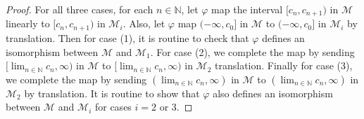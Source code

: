 \documentclass{article}
\begin{document}
\begin{enumerate}[label={\bf Q\arabic*:}]
\begin{enumerate}
\begin{proof}
          For all three cases, for each $n\in\mathbb{N}$, let $\varphi$ map
          the interval $[c_n,c_{n+1})$ in $\mathcal{M}$ linearly to
          $[c_n,c_{n+1})$ in $\mathcal{M}_i$. Also, let $\varphi$ map
          $(-\infty,c_0]$ in $\mathcal{M}$ to $(-\infty,c_0]$ in
          $\mathcal{M}_i$ by translation. Then for case (1), it is routine
          to check that $\varphi$ defines an isomorphism between
          $\mathcal{M}$ and $\mathcal{M}_1$. For case (2), we complete the
          map by sending $[\lim_{n\in\mathbb{N}}c_n,\infty)$ in
          $\mathcal{M}$ to $[\lim_{n\in\mathbb{N}}c_n,\infty)$ in
          $\mathcal{M}_2$ translation. Finally for case (3), we complete
          the map by sending $(\lim_{n\in\mathbb{N}}c_n,\infty)$ in
          $\mathcal{M}$ to $(\lim_{n\in\mathbb{N}}c_n,\infty)$ in
          $\mathcal{M}_2$ by translation. It is routine to show that
          $\varphi$ also defines an isomorphism between $\mathcal{M}$ and
          $\mathcal{M}_i$ for cases $i=2$ or $3$.
        \end{proof}
    \end{enumerate}
\end{enumerate}
\end{document}
